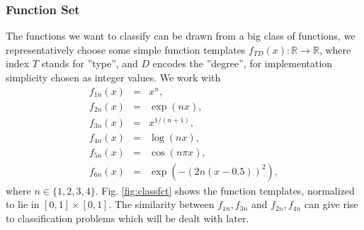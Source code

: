 \documentclass[useAMS,usenatbib]{templates/mn2e}
\begin{document}
\subsubsection{Function Set}
The functions we want to classify can be drawn from a big class of
functions, we representatively choose some simple function templates
$f_{TD}(x):\mathbb{R}\to\mathbb{R}$, where index $T$ stands for
''type'', and $D$ encodes the ''degree'', for implementation
simplicity chosen as integer values. We work with
%
\begin{eqnarray}\label{eq:class}
  f_{1n}(x)&=&x^n,\\
  f_{2n}(x)&=&\exp(nx),\\
  f_{3n}(x)&=&x^{1/(n+1)},\\
  f_{4n}(x)&=&\log(nx),\\
  f_{5n}(x)&=&\cos(n\pi x),\\
  f_{6n}(x)&=&\exp(-(2n(x-0.5))^2),
\end{eqnarray}
%
where $n\in\{1,2,3,4\}$. Fig. \ref{fig:classfct} shows the function
templates, normalized to lie in $[0,1]\times[0,1]$. The similarity
between $f_{1n},f_{3n}$ and $f_{2n},f_{4n}$ can give rise to
classification problems which will be dealt with later.
\end{document}
